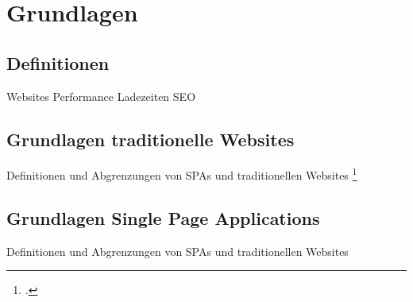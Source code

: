 \section{Grundlagen}
\subsection{Definitionen}
Websites
Performance
Ladezeiten
SEO
\subsection{Grundlagen traditionelle Websites}
Definitionen und Abgrenzungen von SPAs und traditionellen Websites
\footcite[Vgl. ][Seite 1]{Scott2015}
\subsection{Grundlagen Single Page Applications}
Definitionen und Abgrenzungen von SPAs und traditionellen Websites